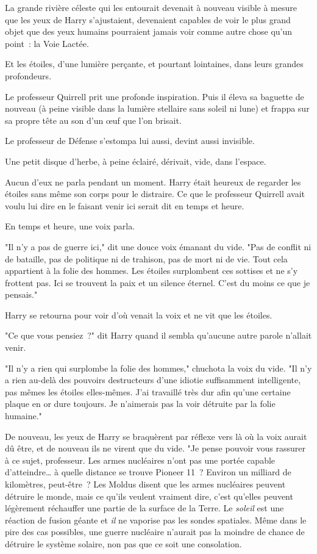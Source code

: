 La grande rivière céleste qui les entourait devenait à nouveau visible à mesure que les yeux de Harry s'ajustaient, devenaient capables de voir le plus grand objet que des yeux humains pourraient jamais voir comme autre chose qu'un point~: la Voie Lactée.

Et les étoiles, d'une lumière perçante, et pourtant lointaines, dans leurs grandes profondeurs.

Le professeur Quirrell prit une profonde inspiration. Puis il éleva sa baguette de nouveau (à peine visible dans la lumière stellaire sans soleil ni lune) et frappa sur sa propre tête au son d'un œuf que l'on brisait.

Le professeur de Défense s'estompa lui aussi, devint aussi invisible.

Une petit disque d'herbe, à peine éclairé, dérivait, vide, dans l'espace.

Aucun d'eux ne parla pendant un moment. Harry était heureux de regarder les étoiles sans même son corps pour le distraire. Ce que le professeur Quirrell avait voulu lui dire en le faisant venir ici serait dit en temps et heure.

En temps et heure, une voix parla.

"Il n'y a pas de guerre ici," dit une douce voix émanant du vide. "Pas de conflit ni de bataille, pas de politique ni de trahison, pas de mort ni de vie. Tout cela appartient à la folie des hommes. Les étoiles surplombent ces sottises et ne s'y frottent pas. Ici se trouvent la paix et un silence éternel. C'est du moins ce que je pensais."

Harry se retourna pour voir d'où venait la voix et ne vit que les étoiles.

"Ce que vous pensiez~?" dit Harry quand il sembla qu'aucune autre parole n'allait venir.

"Il n'y a rien qui surplombe la folie des hommes," chuchota la voix du vide. "Il n'y a rien au-delà des pouvoirs destructeurs d'une idiotie suffisamment intelligente, pas mêmes les étoiles elles-mêmes. J'ai travaillé très dur afin qu'une certaine plaque en or dure toujours. Je n'aimerais pas la voir détruite par la folie humaine."

De nouveau, les yeux de Harry se braquèrent par réflexe vers là où la voix aurait dû être, et de nouveau ils ne virent que du vide. "Je pense pouvoir vous rassurer à ce sujet, professeur. Les armes nucléaires n'ont pas une portée capable d'atteindre… à quelle distance se trouve Pioneer 11~? Environ un milliard de kilomètres, peut-être~? Les Moldus disent que les armes nucléaires peuvent détruire le monde, mais ce qu'ils veulent vraiment dire, c'est qu'elles peuvent légèrement réchauffer une partie de la surface de la Terre. Le \emph{soleil} est une réaction de fusion géante et \emph{il} ne vaporise pas les sondes spatiales. Même dans le pire des cas possibles, une guerre nucléaire n'aurait pas la moindre de chance de détruire le système solaire, non pas que ce soit une consolation.


